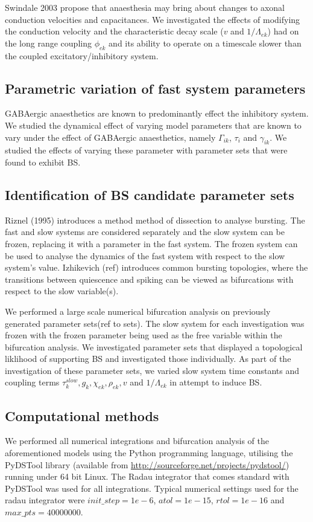 \documentclass[a4paper,12pt]{article}
\begin{document}
Swindale 2003 propose that anaesthesia may bring about changes to axonal conduction velocities and capacitances. We investigated the
effects of modifying the conduction velocity and the characteristic decay scale ($v$ and $1 / \Lambda_{ek}$) had on the
long range coupling $\phi_{ek}$ and its ability to operate on a timescale slower than the coupled excitatory/inhibitory system.

\subsection{Parametric variation of fast system parameters}
GABAergic anaesthetics are known to predominantly effect the inhibitory system. We studied the dynamical effect of varying model parameters that are known to vary under the effect of GABAergic anaesthetics, namely $\Gamma_{ik}$, $\tau_i$ and $\gamma_{ik}$. We studied the effects of varying these parameter with parameter sets that were found to exhibit BS.

\subsection{Identification of BS candidate parameter sets}
Riznel (1995) introduces a method method of dissection to analyse bursting. The fast and slow systems are considered separately and the slow system can be frozen, replacing it with a parameter in the fast system. The frozen system can be used to analyse the dynamics of the fast system with respect to the slow system's value. Izhikevich (ref) introduces common bursting topologies, where the transitions between quiescence and spiking can be viewed as bifurcations with respect to the slow variable(s).

We performed a large scale numerical bifurcation analysis on previously generated parameter sets(ref to sets). The slow system for each investigation was frozen with the frozen parameter being used as the free variable within the bifurcation analysis. We investigated parameter sets that displayed a topological liklihood of supporting BS and investigated those individually. As part of the investigation of these parameter sets, we varied slow system time constants and coupling terms $\tau_k^{slow}, g_k, \chi_{ek}, \rho_{ek}, v$ and $1 / \Lambda_{ek}$ in attempt to induce BS.

\subsection{Computational methods}
We performed all numerical integrations and bifurcation analysis of the aforementioned models using the Python programming language, utilising
the PyDSTool library (available from \url{http://sourceforge.net/projects/pydstool/}) running under 64 bit
Linux. The Radau integrator that comes standard with PyDSTool was used for all integrations.
Typical numerical settings used for the radau integrator were $init\_step = 1e-6$, $atol = 1e-15$, $rtol = 1e-16$ and
$max\_pts = 40000000$.
\end{document}
